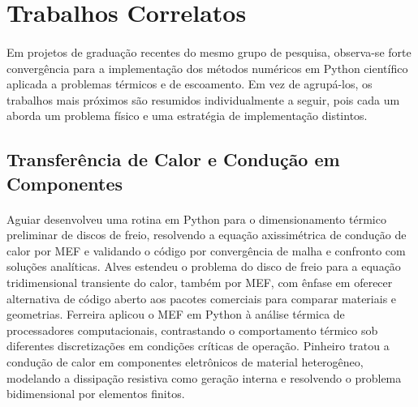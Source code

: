 \section{Trabalhos Correlatos}

\paragraph{}Em projetos de graduação recentes do mesmo grupo de pesquisa, observa-se forte convergência para a implementação dos métodos numéricos em Python científico aplicada a problemas térmicos e de escoamento. Em vez de agrupá-los, os trabalhos mais próximos são resumidos individualmente a seguir, pois cada um aborda um problema físico e uma estratégia de implementação distintos.

\subsection{Transferência de Calor e Condução em Componentes}

\paragraph{}Aguiar \cite{Aguiar2020} desenvolveu uma rotina em Python para o dimensionamento térmico preliminar de discos de freio, resolvendo a equação axissimétrica de condução de calor por MEF e validando o código por convergência de malha e confronto com soluções analíticas. Alves \cite{Alves2021} estendeu o problema do disco de freio para a equação tridimensional transiente do calor, também por MEF, com ênfase em oferecer alternativa de código aberto aos pacotes comerciais para comparar materiais e geometrias. Ferreira \cite{Ferreira2022} aplicou o MEF em Python à análise térmica de processadores computacionais, contrastando o comportamento térmico sob diferentes discretizações em condições críticas de operação. Pinheiro \cite{Pinheiro2022} tratou a condução de calor em componentes eletrônicos de material heterogêneo, modelando a dissipação resistiva como geração interna e resolvendo o problema bidimensional por elementos finitos.

